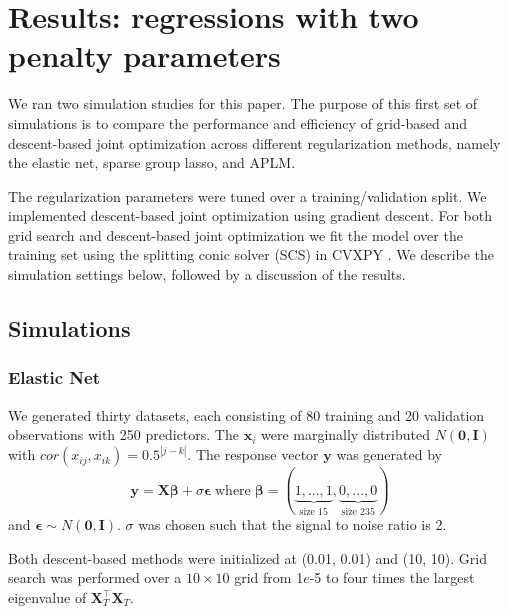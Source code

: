\documentclass{statsoc}
\begin{document}
\section{Results: regressions with two penalty parameters}\label{sec:results1}\label{results1}

We ran two simulation studies for this paper. The purpose of this first set of simulations is to compare the performance and efficiency of grid-based and descent-based joint optimization across different regularization methods, namely the elastic net, sparse group lasso, and APLM.

The regularization parameters were tuned over a training/validation split. We implemented descent-based joint optimization using gradient descent. For both grid search and descent-based joint optimization we fit the model over the training set using the splitting conic solver (SCS) in CVXPY \citep{cvxpy}. We describe the simulation settings below, followed by a discussion of the results.

\subsection{Simulations}
\subsubsection{Elastic Net}
We generated thirty datasets, each consisting of 80 training and 20 validation observations with 250 predictors. The $\boldsymbol x_i$ were marginally distributed $N(\boldsymbol 0,\boldsymbol I)$ with $cor(x_{ij},x_{ik}) = 0.5^{|j-k|}$.
The response vector $\boldsymbol y$ was generated by
\begin{equation}
\boldsymbol y = \boldsymbol X \boldsymbol \beta + \sigma \boldsymbol \epsilon \; \text{where} \; \boldsymbol \beta = (\underbrace{1, ..., 1}_\text{size 15}, \underbrace{0, ..., 0}_\text{size 235})
\end{equation}
and $\boldsymbol \epsilon \sim N(\boldsymbol 0, \boldsymbol I)$. $\sigma$ was chosen such that the signal to noise ratio is 2. 

Both descent-based methods were initialized at (0.01, 0.01) and (10, 10). Grid search was performed over a $10 \times 10$ grid from 1$e$-5 to four times the largest eigenvalue of $\boldsymbol X_T^\top \boldsymbol X_T$.
\end{document}
